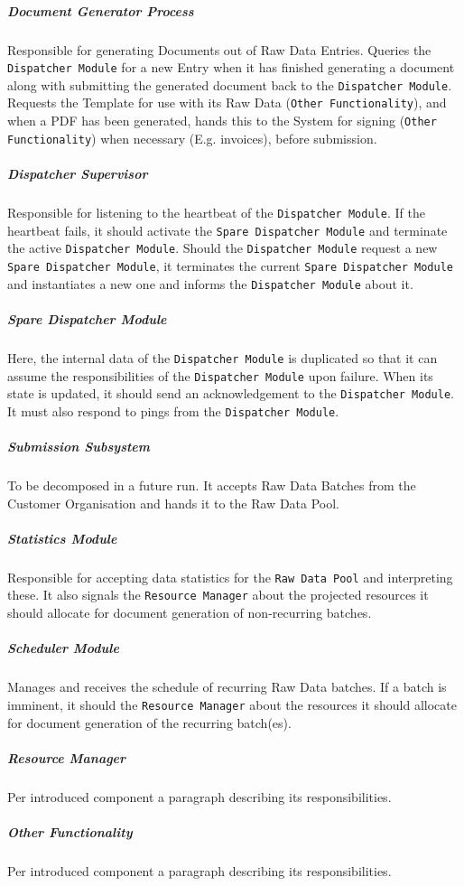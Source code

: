 \documentclass[a4paper,10pt]{article}
\begin{document}
\subparagraph{Document Generator Process}
Responsible for generating Documents out of Raw Data Entries. Queries the \texttt{Dispatcher Module} for a new Entry when it has finished generating a document along with submitting the generated document back to the \texttt{Dispatcher Module}. Requests the Template for use with its Raw Data (\texttt{Other Functionality}), and when a PDF has been generated, hands this to the System for signing (\texttt{Other Functionality}) when necessary (E.g. invoices), before submission.

\subparagraph{Dispatcher Supervisor}
Responsible for listening to the heartbeat of the \texttt{Dispatcher Module}. If the heartbeat fails, it should activate the \texttt{Spare Dispatcher Module} and terminate the active \texttt{Dispatcher Module}. Should the \texttt{Dispatcher Module} request a new \texttt{Spare Dispatcher Module}, it terminates the current \texttt{Spare Dispatcher Module} and instantiates a new one and informs the \texttt{Dispatcher Module} about it.

\subparagraph{Spare Dispatcher Module}
Here, the internal data of the \texttt{Dispatcher Module} is duplicated so that it can assume the responsibilities of the \texttt{Dispatcher Module} upon failure. When its state is updated, it should send an acknowledgement to the \texttt{Dispatcher Module}. It must also respond to pings from the \texttt{Dispatcher Module}.

\subparagraph{Submission Subsystem}
To be decomposed in a future run. It accepts Raw Data Batches from the Customer Organisation and hands it to the Raw Data Pool.

\subparagraph{Statistics Module}
Responsible for accepting data statistics for the \texttt{Raw Data Pool} and interpreting these. It also signals the \texttt{Resource Manager} about the projected resources it should allocate for document generation of non-recurring batches.

\subparagraph{Scheduler Module}
Manages and receives the schedule of recurring Raw Data batches. If a batch is imminent, it should the \texttt{Resource Manager} about the resources it should allocate for document generation of the recurring batch(es).

\subparagraph{Resource Manager}
Per introduced component a paragraph describing its responsibilities.

\subparagraph{Other Functionality}
Per introduced component a paragraph describing its responsibilities.
\end{document}
